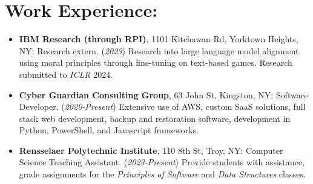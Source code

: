\documentclass[12pt]{article}
\begin{document}
\section*{Work Experience:}
\begin{itemize}
    \itemsep0em 
    \item \textbf{IBM Research (through RPI)}, 1101 Kitchawan Rd, Yorktown Heights, NY: Research extern. (\textit{2023}) Research into large language model alignment using moral principles through fine-tuning on text-based games.  Research submitted to \textit{ICLR} 2024.
    
    \item \textbf{Cyber Guardian Consulting Group}, 63 John St, Kingston, NY: Software Developer. (\textit{2020-Present}) Extensive use of AWS, custom SaaS solutions, full stack web development, backup and restoration software, development in Python, PowerShell, and Javascript frameworks.
    
    \item \textbf{Rensselaer Polytechnic Institute}, 110 8th St, Troy, NY: Computer Science Teaching Assistant. (\textit{2023-Present}) Provide students with assistance, grade assignments for the \textit{Principles of Software} and \textit{Data Structures} classes.
\end{itemize}
\end{document}
